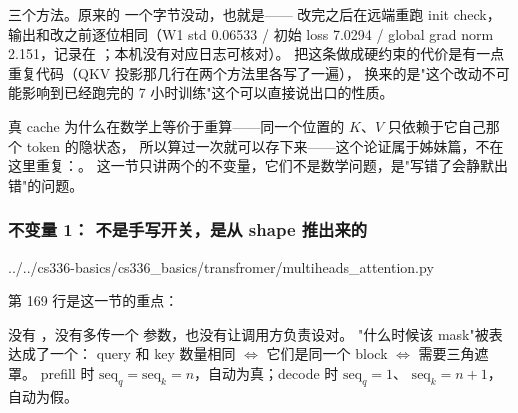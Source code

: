 三个方法。原来的  一个字节没动，也就是——
改完之后在远端重跑 init check，输出和改之前逐位相同（W1 std 0.06533 / 初始 loss 7.0294 /
global grad norm 2.151，记录在 ；本机没有对应日志可核对）。
把这条做成硬约束的代价是有一点重复代码（QKV 投影那几行在两个方法里各写了一遍），
换来的是"这个改动不可能影响到已经跑完的 7 小时训练"这个可以直接说出口的性质。

真 cache 为什么在数学上等价于重算——同一个位置的 $K$、$V$ 只依赖于它自己那个 token 的隐状态，
所以算过一次就可以存下来——这个论证属于姊妹篇，不在这里重复：。
这一节只讲两个的不变量，它们不是数学问题，是"写错了会静默出错"的问题。

\subsubsection{不变量 1： 不是手写开关，是从 shape 推出来的}

%
  {../../cs336-basics/cs336_basics/transfromer/multiheads_attention.py}

第 169 行是这一节的重点：

\begin{center}
\end{center}

没有 ，没有多传一个  参数，也没有让调用方负责设对。
"什么时候该 mask"被表达成了一个：
query 和 key 数量相同 $\Leftrightarrow$ 它们是同一个 block $\Leftrightarrow$ 需要三角遮罩。
prefill 时 $\text{seq}_q = \text{seq}_k = n$，自动为真；decode 时 $\text{seq}_q = 1$、
$\text{seq}_k = n{+}1$，自动为假。

